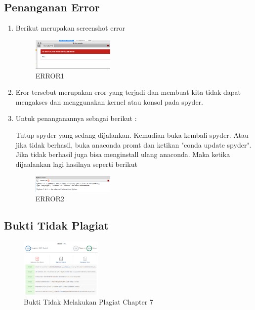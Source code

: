 \subsection{Penanganan Error}
\begin{enumerate}

\item Berikut merupakan screenshot error
	\begin{figure}[H]
		\includegraphics[width=4cm]{figures/1174008/7/error1.PNG}
            	\centering
           	 \caption{ERROR1}
       	 \end{figure}

\item Eror tersebut merupakan eror yang terjadi dan membuat kita tidak dapat mengakses dan menggunakan kernel atau konsol pada spyder.

\item Untuk penanganannya sebagai berikut :

Tutup spyder yang sedang dijalankan. Kemudian buka kembali spyder. Atau jika tidak berhasil, buka anaconda promt dan ketikan "conda update spyder". Jika tidak berhasil juga bisa menginstall ulang anaconda. Maka ketika dijaalankan lagi hasilnya seperti berikut 			\begin{figure}[H]
		\includegraphics[width=4cm]{figures/1174008/7/error2.PNG}
            	\centering
           	 \caption{ERROR2}
       	 \end{figure}

\end{enumerate}

\subsection{Bukti Tidak Plagiat}
\begin{figure}[H]
\centering
	\includegraphics[width=4cm]{figures/1174008/7/bukticekplagiat.PNG}
	\caption{Bukti Tidak Melakukan Plagiat Chapter 7}
\end{figure}
